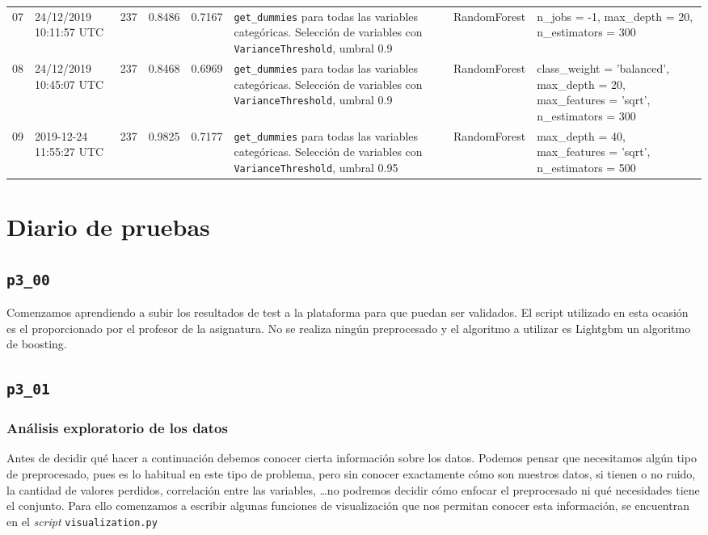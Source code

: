 \documentclass[a4paper, 20pt]{article}
\begin{document}
\begin{longtable}{lL{2cm}lllL{3cm}L{2.5cm}L{3.5cm}}
07 & 24/12/2019 10:11:57 UTC & 237 & 0.8486 & 0.7167 & \texttt{get\_dummies} para todas las variables categóricas. Selección de variables con \texttt{VarianceThreshold}, umbral 0.9 & RandomForest & {\ttfamily n\_jobs = -1, max\_depth = 20, n\_estimators = 300}\\

08 & 24/12/2019 10:45:07 UTC & 237 & 0.8468 & 0.6969 & \texttt{get\_dummies} para todas las variables categóricas. Selección de variables con \texttt{VarianceThreshold}, umbral 0.9 & RandomForest & {\ttfamily class\_weight = 'balanced', max\_depth = 20, max\_features = 'sqrt', n\_estimators = 300}\\

09 & 2019-12-24 11:55:27 UTC & 237 & 0.9825 & 0.7177 & \texttt{get\_dummies} para todas las variables categóricas. Selección de variables con \texttt{VarianceThreshold}, umbral 0.95 & RandomForest & {\ttfamily max\_depth = 40, max\_features = 'sqrt', n\_estimators = 500}\\
\bottomrule
\end{longtable}
\newpage

\section{Diario de pruebas}
\subsection{\texttt{p3\_00}}
Comenzamos aprendiendo a subir los resultados de test a la plataforma para que puedan ser validados. El script utilizado en esta ocasión es el proporcionado por el profesor de la asignatura. No se realiza ningún preprocesado y el algoritmo a utilizar es Lightgbm un algoritmo de boosting.

\subsection{\texttt{p3\_01}}
\subsubsection{Análisis exploratorio de los datos}

Antes de decidir qué hacer a continuación debemos conocer cierta información sobre los datos. Podemos pensar que necesitamos algún tipo de preprocesado, pues es lo habitual en este tipo de problema, pero sin conocer exactamente cómo son nuestros datos, si tienen o no ruido, la cantidad de valores perdidos, correlación entre las variables, \dots no podremos decidir cómo enfocar el preprocesado ni qué necesidades tiene el conjunto. Para ello comenzamos a escribir algunas funciones de visualización que nos permitan conocer esta información, se encuentran en el \textit{script} \texttt{visualization.py}
\end{document}
